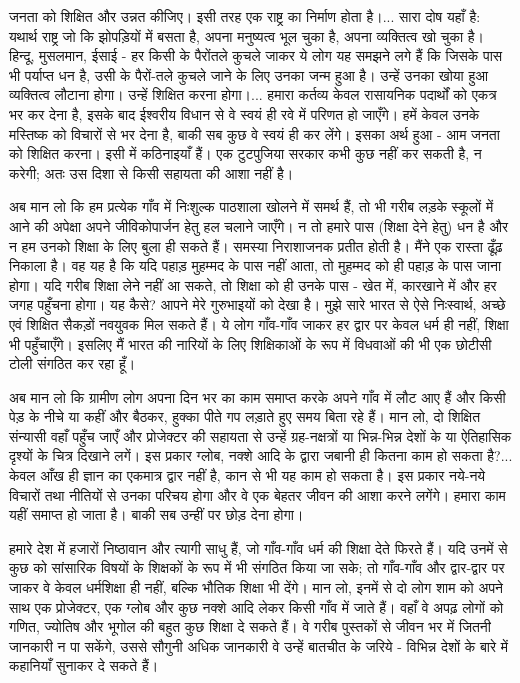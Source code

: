 
जनता को शिक्षित और उन्नत कीजिए। इसी तरह एक राष्ट्र का निर्माण होता है।... सारा दोष यहाँ है: यथार्थ राष्ट्र जो कि झोपड़ियों में बसता है, अपना मनुष्यत्व भूल चुका है, अपना व्यक्तित्व खो चुका है। हिन्दू, मुसलमान, ईसाई - हर किसी के पैरोंतले कुचले जाकर ये लोग यह समझने लगे हैं कि जिसके पास भी पर्याप्त धन है, उसी के पैरों-तले कुचले जाने के लिए उनका जन्म हुआ है। उन्हें उनका खोया हुआ व्यक्तित्व लौटाना होगा। उन्हें शिक्षित करना होगा।... हमारा कर्तव्य केवल रासायनिक पदार्थों को एकत्र भर कर देना है, इसके बाद ईश्वरीय विधान से वे स्वयं ही रवे में परिणत हो जाएँगे। हमें केवल उनके मस्तिष्क को विचारों से भर देना है, बाकी सब कुछ वे स्वयं ही कर लेंगे। इसका अर्थ हुआ - आम जनता को शिक्षित करना। इसी में कठिनाइयाँ हैं। एक टुटपुजिया सरकार कभी कुछ नहीं कर सकती है, न करेगी; अतः उस दिशा से किसी सहायता की आशा नहीं है। 

अब मान लो कि हम प्रत्येक गाँव में निःशुल्क पाठशाला खोलने में समर्थ हैं, तो भी गरीब लड़के स्कूलों में आने की अपेक्षा अपने जीविकोपार्जन हेतु हल चलाने जाएँगे। न तो हमारे पास (शिक्षा देने हेतु) धन है और न हम उनको शिक्षा के लिए बुला ही सकते हैं। समस्या निराशाजनक प्रतीत होती है। मैंने एक रास्ता ढूँढ़ निकाला है। वह यह है कि यदि पहाड़ मुहम्मद के पास नहीं आता, तो मुहम्मद को ही पहाड़ के पास जाना होगा। यदि गरीब शिक्षा लेने नहीं आ सकते, तो शिक्षा को ही उनके पास - खेत में, कारखाने में और हर जगह पहुँचना होगा। यह कैसे? आपने मेरे गुरुभाइयों को देखा है। मुझे सारे भारत से ऐसे निःस्वार्थ, अच्छे एवं शिक्षित सैकड़ों नवयुवक मिल सकते हैं। ये लोग गाँव-गाँव जाकर हर द्वार पर केवल धर्म ही नहीं, शिक्षा भी पहुँचाएँगे। इसलिए मैं भारत की नारियों के लिए शिक्षिकाओं के रूप में विधवाओं की भी एक छोटीसी टोली संगठित कर रहा हूँ। 

अब मान लो कि ग्रामीण लोग अपना दिन भर का काम समाप्त करके अपने गाँव में लौट आए हैं और किसी पेड़ के नीचे या कहीं और बैठकर, हुक्का पीते गप लड़ाते हुए समय बिता रहे हैं। मान लो, दो शिक्षित संन्यासी वहाँ पहुँच जाएँ और प्रोजेक्टर की सहायता से उन्हें ग्रह-नक्षत्रों या भिन्न-भिन्न देशों के या ऐतिहासिक दृश्यों के चित्र दिखाने लगें। इस प्रकार ग्लोब, नक्शे आदि के द्वारा जबानी ही कितना काम हो सकता है?... केवल आँख ही ज्ञान का एकमात्र द्वार नहीं है, कान से भी यह काम हो सकता है। इस प्रकार नये-नये विचारों तथा नीतियों से उनका परिचय होगा और वे एक बेहतर जीवन की आशा करने लगेंगे। हमारा काम यहीं समाप्त हो जाता है। बाकी सब उन्हीं पर छोड़ देना होगा। 

\newpage

हमारे देश में हजारों निष्ठावान और त्यागी साधु हैं, जो गाँव-गाँव धर्म की शिक्षा देते फिरते हैं। यदि उनमें से कुछ को सांसारिक विषयों के शिक्षकों के रूप में भी संगठित किया जा सके; तो गाँव-गाँव और द्वार-द्वार पर जाकर वे केवल धर्मशिक्षा ही नहीं, बल्कि भौतिक शिक्षा भी देंगे। मान लो, इनमें से दो लोग शाम को अपने साथ एक प्रोजेक्टर, एक ग्लोब और कुछ नक्शे आदि लेकर किसी गाँव में जाते हैं। वहाँ वे अपढ़ लोगों को गणित, ज्योतिष और भूगोल की बहुत कुछ शिक्षा दे सकते हैं। वे गरीब पुस्तकों से जीवन भर में जितनी जानकारी न पा सकेंगे, उससे सौगुनी अधिक जानकारी वे उन्हें बातचीत के जरिये - विभिन्न देशों के बारे में कहानियाँ सुनाकर दे सकते हैं। 

